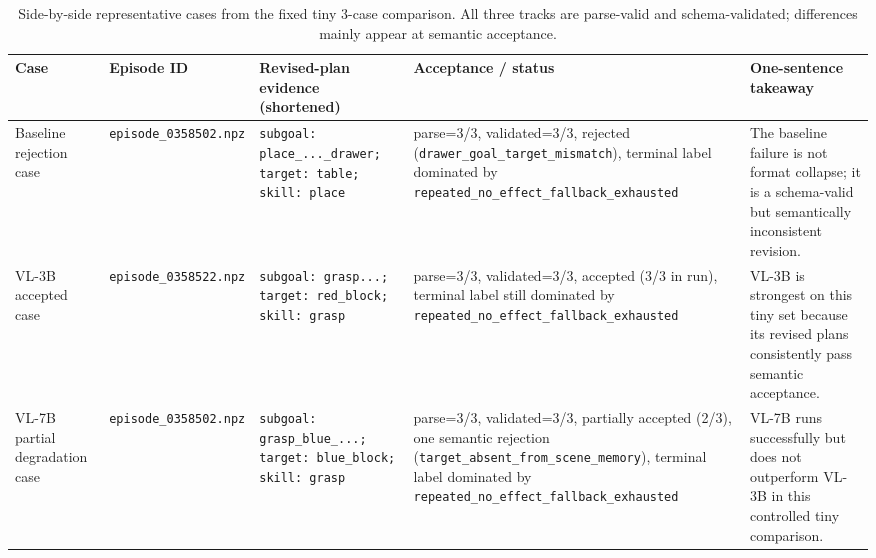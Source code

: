 \begin{table}[t]
\caption{Side-by-side representative cases from the fixed tiny 3-case comparison. All three tracks are parse-valid and schema-validated; differences mainly appear at semantic acceptance.}
\label{tab:case-studies}
\centering
\begin{tabular}{p{}p{}p{}p{}p{}}
\toprule
Case & Episode ID & Revised-plan evidence (shortened) & Acceptance / status & One-sentence takeaway \\
\midrule
Baseline rejection case &
\texttt{episode\_0358502.npz} &
\texttt{subgoal: place\_...\_drawer; target: table; skill: place} &
parse=3/3, validated=3/3, rejected (\texttt{drawer\_goal\_target\_mismatch}), terminal label dominated by \texttt{repeated\_no\_effect\_fallback\_exhausted} &
The baseline failure is not format collapse; it is a schema-valid but semantically inconsistent revision. \\
\midrule
VL-3B accepted case &
\texttt{episode\_0358522.npz} &
\texttt{subgoal: grasp...; target: red\_block; skill: grasp} &
parse=3/3, validated=3/3, accepted (3/3 in run), terminal label still dominated by \texttt{repeated\_no\_effect\_fallback\_exhausted} &
VL-3B is strongest on this tiny set because its revised plans consistently pass semantic acceptance. \\
\midrule
VL-7B partial degradation case &
\texttt{episode\_0358502.npz} &
\texttt{subgoal: grasp\_blue\_...; target: blue\_block; skill: grasp} &
parse=3/3, validated=3/3, partially accepted (2/3), one semantic rejection (\texttt{target\_absent\_from\_scene\_memory}), terminal label dominated by \texttt{repeated\_no\_effect\_fallback\_exhausted} &
VL-7B runs successfully but does not outperform VL-3B in this controlled tiny comparison. \\
\bottomrule
\end{tabular}
\end{table}
